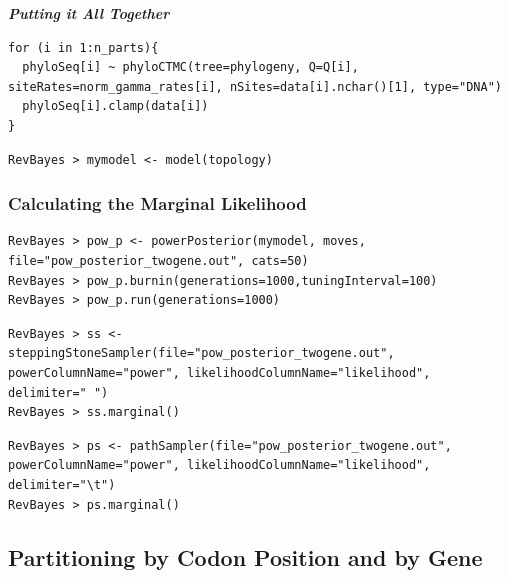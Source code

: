 \documentclass[11pt]{article}
\begin{document}
\textbf{\textit{Putting it All Together}}

{\tt \begin{snugshade*}
\begin{lstlisting}
for (i in 1:n_parts){
  phyloSeq[i] ~ phyloCTMC(tree=phylogeny, Q=Q[i], siteRates=norm_gamma_rates[i], nSites=data[i].nchar()[1], type="DNA")
  phyloSeq[i].clamp(data[i])
}
\end{lstlisting}
\end{snugshade*}}


{\tt \begin{snugshade*}
\begin{lstlisting}
RevBayes > mymodel <- model(topology)
\end{lstlisting}
\end{snugshade*}}

\subsubsection*{Calculating the Marginal Likelihood}

{\tt \begin{snugshade*}
\begin{lstlisting}
RevBayes > pow_p <- powerPosterior(mymodel, moves, file="pow_posterior_twogene.out", cats=50) 
RevBayes > pow_p.burnin(generations=1000,tuningInterval=100)
RevBayes > pow_p.run(generations=1000)  
\end{lstlisting}
\end{snugshade*}}

{\tt \begin{snugshade*}
\begin{lstlisting}
RevBayes > ss <- steppingStoneSampler(file="pow_posterior_twogene.out", powerColumnName="power", likelihoodColumnName="likelihood", delimiter="	")
RevBayes > ss.marginal() 
\end{lstlisting}
\end{snugshade*}}

{\tt \begin{snugshade*}
\begin{lstlisting}
RevBayes > ps <- pathSampler(file="pow_posterior_twogene.out", powerColumnName="power", likelihoodColumnName="likelihood", delimiter="\t")
RevBayes > ps.marginal() 
\end{lstlisting}
\end{snugshade*}}




\bigskip
\subsection{Partitioning by Codon Position and by Gene}\label{secExtremeP}
\end{document}
